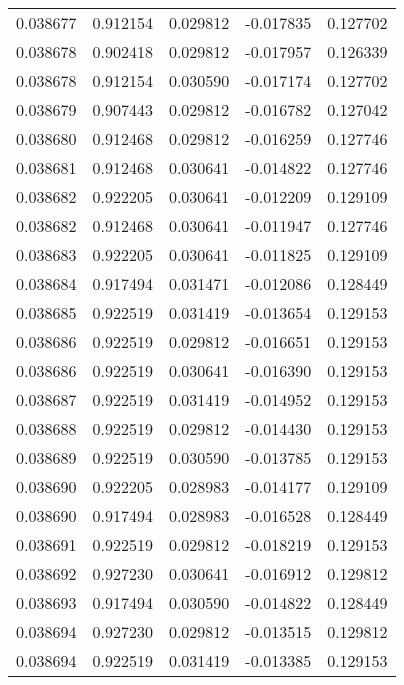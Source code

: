 \begin{tabular}{lrrrr}
0.038677    &  0.912154 &  0.029812 & -0.017835 &             0.127702 \\
0.038678    &  0.902418 &  0.029812 & -0.017957 &             0.126339 \\
0.038678    &  0.912154 &  0.030590 & -0.017174 &             0.127702 \\
0.038679    &  0.907443 &  0.029812 & -0.016782 &             0.127042 \\
0.038680    &  0.912468 &  0.029812 & -0.016259 &             0.127746 \\
0.038681    &  0.912468 &  0.030641 & -0.014822 &             0.127746 \\
0.038682    &  0.922205 &  0.030641 & -0.012209 &             0.129109 \\
0.038682    &  0.912468 &  0.030641 & -0.011947 &             0.127746 \\
0.038683    &  0.922205 &  0.030641 & -0.011825 &             0.129109 \\
0.038684    &  0.917494 &  0.031471 & -0.012086 &             0.128449 \\
0.038685    &  0.922519 &  0.031419 & -0.013654 &             0.129153 \\
0.038686    &  0.922519 &  0.029812 & -0.016651 &             0.129153 \\
0.038686    &  0.922519 &  0.030641 & -0.016390 &             0.129153 \\
0.038687    &  0.922519 &  0.031419 & -0.014952 &             0.129153 \\
0.038688    &  0.922519 &  0.029812 & -0.014430 &             0.129153 \\
0.038689    &  0.922519 &  0.030590 & -0.013785 &             0.129153 \\
0.038690    &  0.922205 &  0.028983 & -0.014177 &             0.129109 \\
0.038690    &  0.917494 &  0.028983 & -0.016528 &             0.128449 \\
0.038691    &  0.922519 &  0.029812 & -0.018219 &             0.129153 \\
0.038692    &  0.927230 &  0.030641 & -0.016912 &             0.129812 \\
0.038693    &  0.917494 &  0.030590 & -0.014822 &             0.128449 \\
0.038694    &  0.927230 &  0.029812 & -0.013515 &             0.129812 \\
0.038694    &  0.922519 &  0.031419 & -0.013385 &             0.129153 \\

\end{tabular}
